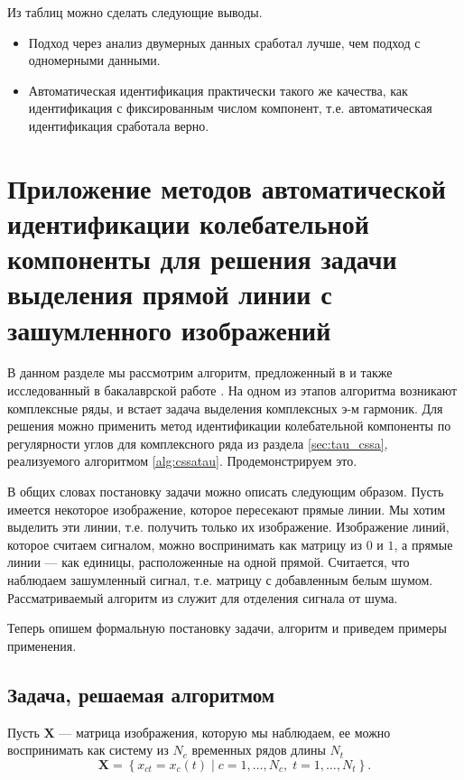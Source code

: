 \documentclass[specialist,
               substylefile = spbu.rtx,
               subf,href,colorlinks=true, 12pt]{disser}
\begin{document}
Из таблиц можно сделать следующие выводы.
\begin{itemize}
\item Подход через анализ двумерных данных сработал лучше, чем подход с одномерными данными.
\item Автоматическая идентификация практически такого же качества, как идентификация с фиксированным числом компонент, т.е. автоматическая идентификация сработала верно.
\end{itemize}

\section{Приложение методов автоматической идентификации колебательной компоненты для решения задачи выделения прямой линии с зашумленного изображений}
\label{sec:use_cssa}

В данном разделе мы рассмотрим алгоритм, предложенный в \cite{Trickett2003} и также исследованный в бакалаврской работе \cite{Zhornikova2016}.
На одном из этапов алгоритма возникают комплексные ряды, и встает задача выделения комплексных э-м гармоник.
Для решения можно применить метод идентификации колебательной компоненты по регулярности углов для комплексного ряда из раздела \ref{sec:tau_cssa}, реализуемого алгоритмом \ref{alg:cssatau}. Продемонстрируем это.

В общих словах постановку задачи можно описать следующим образом. Пусть имеется некоторое изображение, которое пересекают прямые линии. Мы хотим выделить эти линии, т.е. получить только их изображение.
Изображение линий, которое считаем сигналом, можно воспринимать как матрицу из $0$ и $1$, а прямые линии --- как единицы, расположенные на одной прямой. Считается, что наблюдаем зашумленный сигнал, т.е. матрицу с добавленным белым шумом.
Рассматриваемый алгоритм из \cite{Trickett2003} служит для отделения сигнала от шума.

Теперь опишем формальную постановку задачи, алгоритм и приведем примеры применения.

\subsection{Задача, решаемая алгоритмом} \label{sec:chapter3_task}
Пусть $\mathbf{X}$ --- матрица изображения, которую мы наблюдаем, ее можно воспринимать как систему из $N_c$ временных рядов длины $N_t$
\begin{equation*}
	\mathbf{X}=\left\{x_{ct}=x_c(t) \; | \; c=1, \ldots, N_c, \; t=1, \ldots, N_t\right\}.
\end{equation*}
\end{document}

